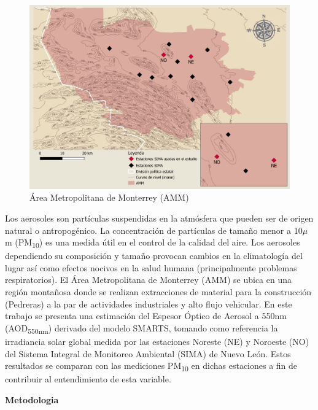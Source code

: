 \documentclass{article}
\begin{document}
\begin{minipage}{0.35\linewidth}
\begin{figure}[H]
\centering
\includegraphics[scale=0.29]{images/AMM10.png}
\caption{Área Metropolitana de Monterrey (AMM)}
\end{figure}
\end{minipage}
\begin{minipage}{0.65\linewidth}
    Los aerosoles son partículas suspendidas en la atmósfera que pueden ser de origen natural o antropogénico. 
    La concentración de partículas de tamaño menor a 10$\mu$m (PM\textsubscript{10}) es una medida útil en el control de la calidad del aire. 
    Los aerosoles dependiendo su composición y tamaño provocan cambios en la climatología del lugar así como efectos nocivos en la 
    salud humana (principalmente problemas respiratorios). El Área Metropolitana de Monterrey (AMM) se ubica en una región montañosa 
    donde se realizan extracciones de material para la construcción (Pedreras) a la par de actividades industriales y alto flujo 
    vehicular. En este trabajo se presenta una estimación del Espesor Óptico de Aerosol a 550nm (AOD\textsubscript{550nm}) derivado del modelo SMARTS, 
    tomando como referencia la irradiancia solar global medida por las estaciones Noreste (NE) y Noroeste (NO) del Sistema Integral de 
    Monitoreo Ambiental (SIMA) de Nuevo León. 
    Estos resultados se comparan con las mediciones PM\textsubscript{10} en dichas estaciones a fin de contribuir al entendimiento de esta variable.
\end{minipage}
\begin{center}
\begin{shaded}
\textbf{\textcolor{ver}{Metodologia}}
\end{shaded}
\end{center}
\end{document}

